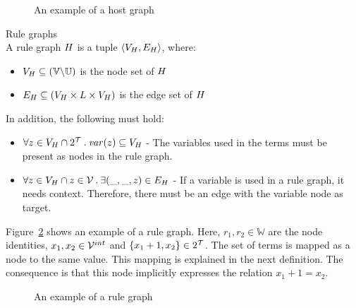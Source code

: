 \begin{figure}[ht]
  \begin{center}
    
  \end{center}
  \caption{An example of a host graph}
  \label{fig:hostgraph_example}
\end{figure}

\vspace{10px}
\begin{definition} Rule graphs \\
A rule graph $H$ is a tuple $\langle V_{H}, E_{H} \rangle$, where:
\begin{itemize}
  \item $V_{H} \subseteq (\mathbb{V} \backslash \mathbb{U})$ is the node set of $H$
  \item $E_{H} \subseteq (V_{H} \times L \times V_{H})$ is the edge set of $H$
\end{itemize}
In addition, the following must hold:
\begin{itemize}
\item $\forall z \in V_{H} \cap 2^{\mathcal{T}}\: .\:\mathit{var}(z) \subseteq V_{H}$ - The variables used in the terms must be present as nodes in the rule graph.
\item $\forall z \in V_{H} \cap z \in \mathcal{V}\: .\: \exists (\_, \_, z) \in E_{H}$ - If a variable is used in a rule graph, it needs context. Therefore, there must be an edge with the variable node as target.
\end{itemize}
\end{definition}
\vspace{10px}

Figure~\ref{fig:rulegraph_example} shows an example of a rule graph. Here, $r_1, r_2 \in \mathbb{W}$ are the node identities, $x_1,x_2 \in \mathcal{V}^{int}$ and $\{x_1+1, x_2\} \in 2^{\mathcal{T}}$. The set of terms is mapped as a node to the same value. This mapping is explained in the next definition. The consequence is that this node implicitly expresses the relation $x_1+1 = x_2$.

\begin{figure}[ht]
  \begin{center}
    
  \end{center}
  \caption{An example of a rule graph}
  \label{fig:rulegraph_example}
\end{figure}


